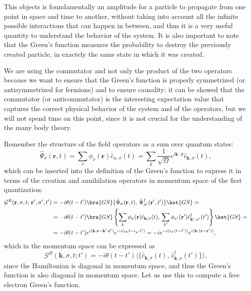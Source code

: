 This objects is foundamentally an amplitude for a particle to propagate from one point in space and time to another, without taking into account all the infinite possible interactions that can happen in between, and thus it is a very useful quantity to understand the behavior of the system. It is also important to note that the Green's function measures the probability to destroy the previously created particle, in exactely the same state in which it was created.

We are using the commutator and not only the product of the two operators because we want to ensure that the Green's function is properly symmetrized (or antisymmetrized for fermions) and to ensure causality: it can be showed that the commutator (or anticommutator) is the interesting expectation value that captures the correct physical behavior of the system and of the operators, but we will not spend time on this point, since it is not crucial for the understanding of the many body theory.

Remember the structure of the field operators as a sum over quantum states:
\[
    \hat{\Psi}_{\sigma} (\mathbf{r}, t) = \sum_{\nu} \phi_{\nu}(\mathbf{r}) \hat{c}_{\alpha, \sigma}(t) = \sum_{k} \frac{1}{\sqrt{\Omega}} e^{i \mathbf{k} \cdot \mathbf{r}} \hat{c}_{\mathbf{k}, \sigma}(t),
\]
which can be inserted into the definition of the Green's function to express it in terms of the creation and annihilation operators in momentum space of the first quantization:
\[
    \begin{aligned}
        \mathcal{G}^R(\mathbf{r}, \sigma, t;\,\mathbf{r}', \sigma', t') & = -i \theta(t - t') \bra{GS} \{\hat{\Psi}_{\sigma} (\mathbf{r}, t),\, \hat{\Psi}_{\sigma'}^\dagger(\mathbf{r}', t') \} \ket{GS} =                                                                                      \\
                                                                        & = -i \theta(t - t') \bra{GS} \left\{ \sum_{k} \phi_{\nu}(\mathbf{r}) \hat{c}_{\mathbf{k}, \sigma}(t),\, \sum_{k'} \phi_{\nu'}(\mathbf{r}') \hat{c}_{\mathbf{k}', \sigma'}^\dagger(t')  \right\}  \ket{GS} =            \\
                                                                        & = -i \theta(t - t')  e^{i (\mathbf{k} \cdot \mathbf{r} -\mathbf{k}' \cdot \mathbf{r}')}  e^{-i (\epsilon_k t -\epsilon_{k'} t')}  = -i  e^{-i (\epsilon_k (t-t'))}  e^{i (\mathbf{k} \cdot (\mathbf{r}-\mathbf{r}'))},
    \end{aligned}
\]
which in the momentum space can be expressed as
\[
    \mathcal{G}^R(\mathbf{k}, \sigma, t; t') = -i \theta(t - t') \langle \{ \hat{c}_{\mathbf{k}, \sigma}(t),\, \hat{c}_{\mathbf{k}, \sigma}^\dagger(t') \} \rangle,
\]
since the Hamiltonian is diagonal in momentum space, and thus the Green's function is also diagonal in momentum space. Let us use this to compute a free electron Green's function.

